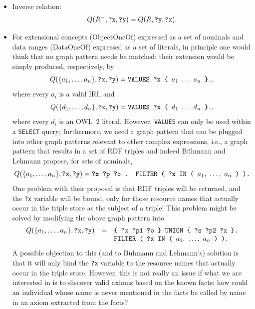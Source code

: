 \documentclass[a4paper]{article}
\newcounter{ex}
\begin{document}
\begin{itemize}

\item Inverse relation:
\begin{equation}
  Q(R^-, \mbox{\tt ?x}, \mbox{\tt ?y}) = Q(R, \mbox{\tt ?y}, \mbox{\tt ?x}).
\end{equation}

\item For extensional concepts (\textsf{ObjectOneOf}) expressed as a set of nominals
and data ranges (\textsf{DataOneOf}) expressed as a set of literals, in principle
one would think that no graph pattern needs be matched: their extension would be
simply produced, respectively, by
\begin{equation}
  Q(\{a_1, \ldots, a_n\}, \mbox{\tt ?x}, \mbox{\tt ?y}) =
    \mbox{\tt VALUES ?x \{ } a_1\ \ldots\ a_n \mbox{\tt\ \}.},
\end{equation}
where every $a_i$ is a valid IRI, and
\begin{equation}
  Q(\{d_1, \ldots, d_n\}, \mbox{\tt ?x}, \mbox{\tt ?y}) =
    \mbox{\tt VALUES ?x \{ } d_1\ \ldots\ d_n \mbox{\tt\ \}.},
\end{equation}
where every $d_i$ is an OWL~2 literal.
However, \texttt{VALUES} can only be used within a \texttt{SELECT} query;
furthermore, we need a graph pattern that can be plugged into other graph patterns
relevant to other complex expressions, i.e., a graph pattern that results in a
set of RDF triples and indeed B\"uhmann and Lehmann propose, for sets of nominals,
\begin{equation}
  Q(\{a_1, \ldots, a_n\}, \mbox{\tt ?x}, \mbox{\tt ?y}) =
    \mbox{\tt ?x ?p ?o . FILTER ( ?x IN ( } a_1,\ \ldots,\ a_n \mbox{\tt\ ) ).}
\end{equation}
One problem with their proposal is that RDF triples will be returned,
and the \texttt{?x} variable will be bound, only for those resource names that
actually occur in the triple store as the subject of a triple!
This problem might be solved by modifying the above graph pattern into
\begin{equation}
  \begin{array}{rcl}
    Q(\{a_1, \ldots, a_n\}, \mbox{\tt ?x}, \mbox{\tt ?y}) &=&
      \mbox{\tt \{ ?x ?p1 ?o \} UNION \{ ?s ?p2 ?x \}.}\\
      && \mbox{\tt FILTER ( ?x IN ( } a_1,\ \ldots,\ a_n \mbox{\tt\ ) ).}
  \end{array}
\end{equation}
A possible objection to this (and to B\"uhmann and Lehmann's) solution is that
it will only bind the \texttt{?x} variable to the resource names that actually occur
in the triple store. However, this is not really an issue if what we are interested in
is to discover valid axioms based on the known facts: how could an individual
whose name is never mentioned in the facts be called by name in an axiom extracted
from the facts?


\end{itemize}
\end{document}

